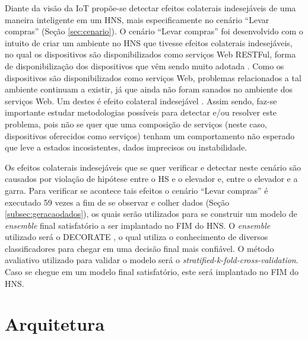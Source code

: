 Diante da visão da IoT propõe-se detectar efeitos colaterais indesejáveis de uma maneira inteligente em um HNS, mais especificamente no cenário ``Levar compras'' (Seção \ref{sec:cenario}). O cenário ``Levar compras'' foi desenvolvido com o intuito de criar um ambiente no HNS que tivesse efeitos colaterais indesejáveis, no qual os dispositivos são disponibilizados como serviços Web RESTFul, forma de disponibilização dos dispositivos que vêm sendo muito adotada \cite{Mineraud:2016}. Como os dispositivos são disponibilizados como serviços Web, problemas relacionados a tal ambiente continuam a existir, já que ainda não foram sanados no ambiente dos serviços Web. Um destes é efeito colateral indesejável \cite{Jiuyun:2010, Jiuyun:2011, Sven:2014}. Assim sendo, faz-se importante estudar metodologias possíveis para detectar e/ou resolver este problema, pois não se quer que uma composição de serviços (neste caso, dispositivos oferecidos como serviços) tenham um comportamento não esperado que leve a estados incosistentes, dados imprecisos ou instabilidade.

Os efeitos colaterais indesejáveis que se quer verificar e detectar neste cenário são causados por violação de hipótese entre o HS e o elevador e, entre o elevador e a garra. Para verificar se acontece tais efeitos o cenário ``Levar compras'' é executado 59 vezes a fim de se observar e colher dados (Seção \ref{subsec:geracaodados}), os quais serão utilizados para se construir um modelo de \textit{ensemble} final satisfatório a ser implantado no FIM do HNS. O \textit{ensemble} utilizado será o DECORATE \cite{Melville:2004}, o qual utiliza o conhecimento de diversos classificadores para chegar em uma decisão final mais confiável. O método avaliativo utilizado para validar o modelo será o \textit{stratified-k-fold-cross-validation}. Caso se chegue em um modelo final satisfatório, este será implantado no FIM do HNS. 

\section{Arquitetura}
\label{sec:arquitetura}

